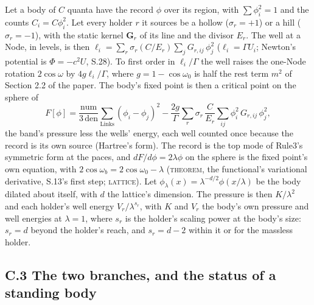 \documentclass[pdflatex,sn-mathphys-num]{sn-jnl}
\newcommand{\num}{\mathrm{num}}
\newcommand{\den}{\mathrm{den}}
\newcommand{\claimmark}[1]{\textup{\textsc{#1}}}
\newcommand{\fence}[1]{\textup{\textsc{#1}}}
\theoremstyle{thmstyleone}
\begin{document}
Let a body of $C$ quanta have the record $\phi$ over its region, with $\sum\phi_i^2 = 1$ and the counts $C_i = C\phi_i^2$. Let every holder $r$ it sources be a hollow ($\sigma_r = +1$) or a hill ($\sigma_r = -1$), with the static kernel $\mathbf G_r$ of its line and the divisor $E_r$. The well at a Node, in levels, is then $\ell_i = \sum_r \sigma_r (C / E_r) \sum_j G_{r,ij}\,\phi_j^2$ ($\ell_i = \Gamma U_i$; Newton's potential is $\Phi = -c^2 U$, S.28). To first order in $\ell_i / \Gamma$ the well raises the one-Node rotation $2\cos\omega$ by $4g\ell_i / \Gamma$, where $g = 1 - \cos\omega_0$ is half the rest term $m^2$ of Section 2.2 of the paper. The body's fixed point is then a critical point on the sphere of
\begin{equation}\label{eq:functional}
F[\phi] = \frac{\num}{3\,\den}\sum_{\text{Links}} (\phi_i - \phi_j)^2 - \frac{2g}{\Gamma}\sum_r \sigma_r\,\frac{C}{E_r}\sum_{ij}\phi_i^2\,G_{r,ij}\,\phi_j^2,
\end{equation}
the band's pressure less the wells' energy, each well counted once because the record is its own source (Hartree's form). The record is the top mode of Rule3's symmetric form at the paces, and $dF / d\phi = 2\lambda\phi$ on the sphere is the fixed point's own equation, with $2\cos\omega_b = 2\cos\omega_0 - \lambda$ (\claimmark{theorem}, the functional's variational derivative, S.13's first step; \fence{lattice}). Let $\phi_\lambda(x) = \lambda^{-d / 2}\phi(x / \lambda)$ be the body dilated about itself, with $d$ the lattice's dimension. The pressure is then $K / \lambda^2$ and each holder's well energy $V_r / \lambda^{s_r}$, with $K$ and $V_r$ the body's own pressure and well energies at $\lambda = 1$, where $s_r$ is the holder's scaling power at the body's size: $s_r = d$ beyond the holder's reach, and $s_r = d - 2$ within it or for the massless holder.

\subsection*{C.3 The two branches, and the status of a standing body}
\end{document}
